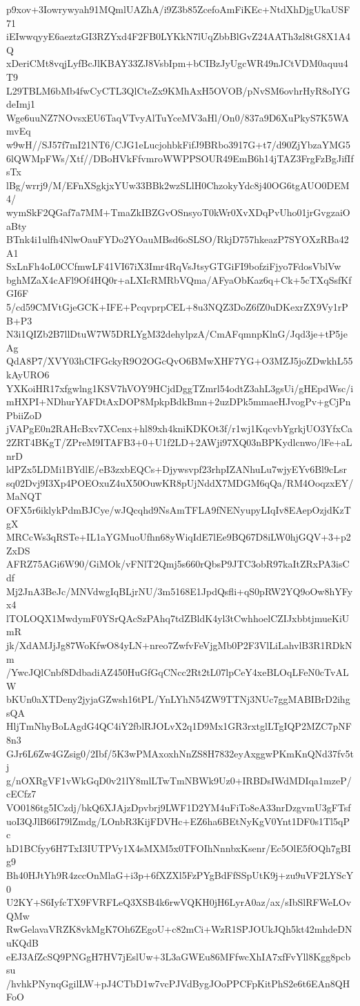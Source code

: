 p9xov+3Iowrywyah91MQmlUAZhA/i9Z3b85ZcefoAmFiKEc+NtdXhDjgUkaUSF71
iEIwwqyyE6aeztzGI3RZYxd4F2FB0LYKkN7lUqZbbBlGvZ24AATh3zl8tG8X1A4Q
xDeriCMt8vqjLyfBcJlKBAY33ZJ8VsbIpm+bCIBzJyUgcWR49nJCtVDM0aquu4T9
L29TBLM6bMb4fwCyCTL3QlCteZx9KMhAxH5OVOB/pNvSM6ovhrHyR8oIYGdeImj1
Wge6uuNZ7NOvsxEU6TaqVTvyAlTuYceMV3aHl/On0/837a9D6XuPkyS7K5WAmvEq
w9wH//SJ57f7mI21NT6/CJG1eLucjohbkFifJ9BRbo3917G+t7/d90ZjYbzaYMG5
6lQWMpFWs/Xtf//DBoHVkFfvmroWWPPSOUR49EmB6h14jTAZ3FrgFzBgJifIfsTx
lBg/wrrj9/M/EFnXSgkjxYUw33BBk2wzSLlH0ChzokyYdc8j40OG6tgAUO0DEM4/
wymSkF2QGaf7a7MM+TmaZkIBZGvOSnsyoT0kWr0XvXDqPvUho01jrGvgzaiOaBty
BTnk4i1ulfh4NlwOauFYDo2YOauMBsd6oSLSO/RkjD757hkeazP7SYOXzRBa42A1
SxLnFh4oL0CCfmwLF41VI67iX3Imr4RqVsJtsyGTGiFI9bofziFjyo7FdosVblVw
bghMZaX4cAFl9Of4HQ0r+aLXIcRMRbVQma/AFyaObKaz6q+Ck+5cTXqSsfKfGI6F
5/cd59CMVtGjeGCK+IFE+PcqvprpCEL+8u3NQZ3DoZ6fZ0uDKexrZX9Vy1rPB+P3
N3i1QIZb2B7llDtuW7W5DRLYgM32dehylpzA/CmAFqmnpKlnG/Jqd3je+tP5jeAg
QdA8P7/XVY03hCIFGckyR9O2OGcQvO6BMwXHF7YG+O3MZJ5joZDwkhL55kAyURO6
YXKoiHR17xfgwlng1KSV7hVOY9HCjdDggTZmrl54odtZ3ahL3gsUi/gHEpdWsc/i
mHXPI+NDhurYAFDtAxDOP8MpkpBdkBmn+2uzDPk5mmaeHJvogPv+gCjPnPbiiZoD
jVAPgE0n2RAHcBxv7XCenx+hl89xh4kniKDKOt3f/r1wj1KqcvbYgrkjUO3YfxCa
2ZRT4BKgT/ZPreM9ITAFB3+0+U1f2LD+2AWji97XQ03nBPKydlcnwo/lFe+aLnrD
ldPZx5LDMi1BYdlE/eB3zxbEQCs+Djywsvpf23rhpIZANhuLu7wjyEYv6Bl9cLsr
sq02Dvj9I3Xp4POEOxuZ4uX50OuwKR8pUjNddX7MDGM6qQa/RM4OoqzxEY/MaNQT
OFX5r6iklykPdmBJCye/wJQcqhd9NsAmTFLA9fNENyupyLIqIv8EAepOzjdKzTgX
MRCcWs3qRSTe+IL1aYGMuoUfhn68yWiqIdE7lEe9BQ67D8iLW0hjGQV+3+p2ZxDS
AFRZ75AGi6W90/GiMOk/vFNlT2Qmj5s660rQbsP9JTC3obR97kaItZRxPA3isCdf
Mj2JnA3BeJc/MNVdwgIqBLjrNU/3m5168E1JpdQsfli+qS0pRW2YQ9oOw8hYFyx4
lTOLOQX1MwdymF0YSrQAcSzPAhq7tdZBldK4yl3tCwhhoelCZIJxbbtjmueKiUmR
jk/XdAMJjJg87WoKfwO84yLN+nreo7ZwfvFeVjgMb0P2F3VlLiLahvlB3R1RDkNm
/YwcJQlCnbf8DdbadiAZ450HuGfGqCNcc2Rt2tL07lpCeY4xeBLOqLFeN0cTvALW
bKUn0aXTDeny2jyjaGZwsh16tPL/YnLYhN54ZW9TTNj3NUc7ggMABIBrD2ihgsQA
HljTmNhyBoLAgdG4QC4iY2fblRJOLvX2q1D9Mx1GR3rxtglLTgIQP2MZC7pNF8n3
GJr6L6Zw4GZsig0/2Ibf/5K3wPMAxoxhNnZS8H7832eyAxggwPKmKnQNd37fv5tj
g/nOXRgVF1vWkGqD0v21lY8mlLTwTmNBWk9Uz0+IRBDsIWdMDIqa1mzeP/cECfz7
VO0186tg5ICzdj/bkQ6XJAjzDpvbrj9LWF1D2YM4uFiTo8eA33nrDzgvmU3gFTsf
uoI3QJlB66I79lZmdg/LOnbR3KijFDVHc+EZ6ha6BEtNyKgV0Ynt1DF0s1Tl5qPc
hD1BCfyy6H7TxI3IUTPVy1X4sMXM5x0TFOIhNnnbxKsenr/Ec5OlE5fOQh7gBIg9
Bh40HJtYh9R4zccOnMlaG+i3p+6fXZXl5FzPYgBdFfSSpUtK9j+zu9uVF2LYScY0
U2KY+S6IyfcTX9FVRFLeQ3XSB4k6rwVQKH0jH6LyrA0az/ax/sIbSlRFWeLOvQMw
RwGelavaVRZK8vkMgK7Oh6ZEgoU+c82mCi+WzR1SPJOUkJQh5kt42mhdeDNuKQdB
eEJ3AfZcSQ9PNGgH7HV7jEslUw+3L3aGWEu86MFfwcXhIA7xfFvYll8Kgg8pcbsu
/hvhkPNynqGgilLW+pJ4CTbD1w7vcPJVdBygJOoPPCFpKitPhS2e6t6EAn8QHFoO
